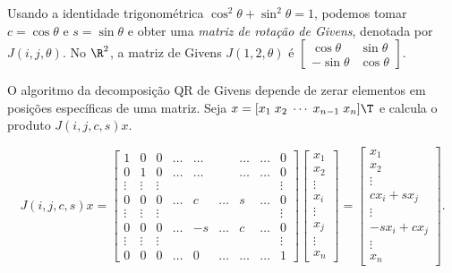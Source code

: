 \documentclass{article}
\begin{document}
Usando a identidade trigonométrica \(\cos^2 \theta + \sin^2 \theta = 1\), podemos tomar \(c=\cos \theta\) e \(s=\sin \theta\) e obter uma \emph{matriz de rotação de Givens}, denotada por \(J(i,j,\theta)\). No \(\R^2\), a matriz de Givens \(J(1,2,\theta)\) é \(\begin{bmatrix} \cos \theta & \sin \theta \\ -\sin \theta & \cos \theta \end{bmatrix}\).

O algoritmo da decomposição QR de Givens depende de zerar elementos em posições específicas de uma matriz. Seja \(x = [x_1 \; x_2 \; \cdots \; x_{n-1} \; x_n]\T \) e calcula o produto \(J(i,j,c,s)x\).

\begin{equation} \label{eq:produto_givens_vetor}
    J(i,j,c,s)x = \begin{bmatrix} 
        1 & 0 & 0 & \ldots & \ldots & & \ldots & \ldots & 0 \\ 
        0 & 1 & 0 & \ldots & \ldots & & \ldots & \ldots & 0 \\ 
        \vdots & \vdots & \vdots & & & & & & \vdots \\ 
        0 & 0 & 0 & \ldots & c & \ldots & s & \ldots & 0 \\ 
        \vdots & \vdots & \vdots & & & & & & \vdots \\ 
        0 & 0 & 0 & \ldots & -s & \ldots & c & \ldots & 0 \\ 
        \vdots & \vdots & \vdots & & & & & & \vdots \\ 
        0 & 0 & 0 & \ldots & 0 & \ldots & \ldots & \ldots & 1 
    \end{bmatrix}
    \begin{bmatrix} x_1 \\ x_2 \\ \vdots \\ x_{i} \\ \vdots \\ x_{j} \\ \vdots \\ x_n 
    \end{bmatrix} 
    = 
    \begin{bmatrix} x_1 \\ x_2 \\ \vdots \\ cx_i + sx_j \\ \vdots \\ -sx_i + cx_j \\ \vdots \\ x_n 
    \end{bmatrix}.
\end{equation}
\end{document}
